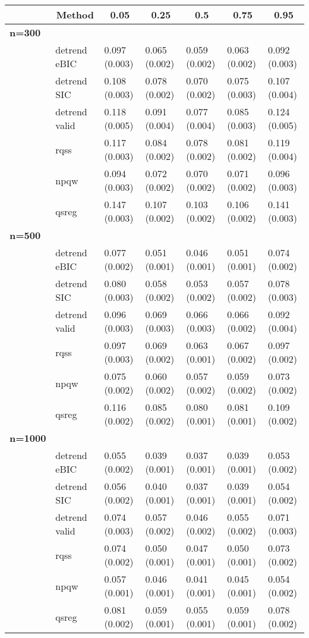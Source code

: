 \begin{table}[!tbp]
\begin{center}
\begin{tabular}{lllllll}
\hline\hline
\multicolumn{1}{l}{}&\multicolumn{1}{c}{Method}&\multicolumn{1}{c}{0.05}&\multicolumn{1}{c}{0.25}&\multicolumn{1}{c}{0.5}&\multicolumn{1}{c}{0.75}&\multicolumn{1}{c}{0.95}\tabularnewline
\hline
{\bfseries n=300}&&&&&&\tabularnewline
~~&detrend eBIC&0.097 (0.003)&0.065 (0.002)&0.059 (0.002)&0.063 (0.002)&0.092 (0.003)\tabularnewline
~~&detrend SIC&0.108 (0.003)&0.078 (0.002)&0.070 (0.002)&0.075 (0.003)&0.107 (0.004)\tabularnewline
~~&detrend valid&0.118 (0.005)&0.091 (0.004)&0.077 (0.004)&0.085 (0.003)&0.124 (0.005)\tabularnewline
~~&rqss&0.117 (0.003)&0.084 (0.002)&0.078 (0.002)&0.081 (0.002)&0.119 (0.004)\tabularnewline
~~&npqw&0.094 (0.003)&0.072 (0.002)&0.070 (0.002)&0.071 (0.002)&0.096 (0.003)\tabularnewline
~~&qsreg&0.147 (0.003)&0.107 (0.002)&0.103 (0.002)&0.106 (0.002)&0.141 (0.003)\tabularnewline
\hline
{\bfseries n=500}&&&&&&\tabularnewline
~~&detrend eBIC&0.077 (0.002)&0.051 (0.001)&0.046 (0.001)&0.051 (0.001)&0.074 (0.002)\tabularnewline
~~&detrend SIC&0.080 (0.003)&0.058 (0.002)&0.053 (0.002)&0.057 (0.002)&0.078 (0.003)\tabularnewline
~~&detrend valid&0.096 (0.003)&0.069 (0.003)&0.066 (0.003)&0.066 (0.002)&0.092 (0.004)\tabularnewline
~~&rqss&0.097 (0.003)&0.069 (0.002)&0.063 (0.001)&0.067 (0.002)&0.097 (0.002)\tabularnewline
~~&npqw&0.075 (0.002)&0.060 (0.002)&0.057 (0.002)&0.059 (0.002)&0.073 (0.002)\tabularnewline
~~&qsreg&0.116 (0.002)&0.085 (0.002)&0.080 (0.001)&0.081 (0.001)&0.109 (0.002)\tabularnewline
\hline
{\bfseries n=1000}&&&&&&\tabularnewline
~~&detrend eBIC&0.055 (0.002)&0.039 (0.001)&0.037 (0.001)&0.039 (0.001)&0.053 (0.002)\tabularnewline
~~&detrend SIC&0.056 (0.002)&0.040 (0.001)&0.037 (0.001)&0.039 (0.001)&0.054 (0.002)\tabularnewline
~~&detrend valid&0.074 (0.003)&0.057 (0.002)&0.046 (0.002)&0.055 (0.002)&0.071 (0.003)\tabularnewline
~~&rqss&0.074 (0.002)&0.050 (0.001)&0.047 (0.001)&0.050 (0.001)&0.073 (0.002)\tabularnewline
~~&npqw&0.057 (0.001)&0.046 (0.001)&0.041 (0.001)&0.045 (0.001)&0.054 (0.002)\tabularnewline
~~&qsreg&0.081 (0.002)&0.059 (0.001)&0.055 (0.001)&0.059 (0.001)&0.078 (0.002)\tabularnewline
\hline
\end{tabular}\end{center}
\end{table}

